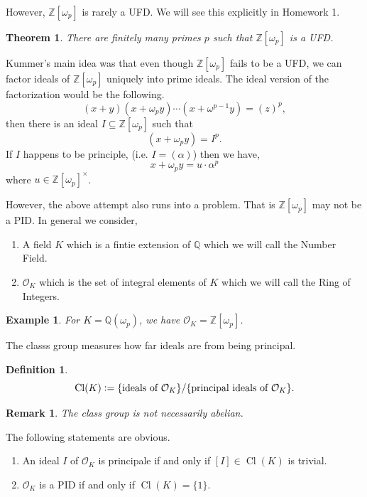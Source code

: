 \documentclass[10pt]{article}
\newtheorem{theorem}{Theorem} [section]
\newtheorem{definition}{Definition}[section]
\newtheorem{remark}{Remark}[section]
\newtheorem{example}{Example}[section]
\DeclareMathOperator{\Cl}{Cl}
\newcommand{\defeq}{\vcentcolon=}
\newcommand{\Z}[0]{\mathbb{Z}}
\newcommand{\Q}[0]{\mathbb{Q}}
\begin{document}
However, $\Z[\omega_p]$ is rarely a UFD. We will see this explicitly in Homework 1.
\begin{theorem}
There are finitely many primes $p$ such that $\Z[\omega_p]$ is a UFD.
\end{theorem}
Kummer's main idea was that even though $\Z[\omega_p]$ fails to be a UFD, we can factor ideals of $\Z[\omega_p]$ uniquely into prime ideals. The ideal version of the factorization would be the following.
\begin{equation*}
    (x+y)(x+\omega_py)\cdots(x+\omega^{p-1}y) = (z)^p,
\end{equation*}
then there is an ideal $I\subseteq\Z[\omega_p]$ such that 
\begin{equation*}
    (x+\omega_py)=I^p.
\end{equation*}
If $I$ happens to be principle, (i.e. $I=(\alpha)$) then we have,
\begin{equation*}
    x+\omega_py = u\cdot\alpha^p
\end{equation*}
where $u\in\Z[\omega_p]^\times$. 
\par However, the above attempt also runs into a problem. That is $\Z[\omega_p]$ may not be a PID. In general we consider,
\begin{enumerate}
    \item A field $K$ which is a fintie extension of $\Q$ which we will call the Number Field.
    \item $\mathcal{O}_K$ which is the set of integral elements of $K$ which we will call the Ring of Integers.
\end{enumerate}
\begin{example}
    For $K=\Q(\omega_p)$, we have $\mathcal{O}_K = \Z[\omega_p]$.
\end{example}
The classs group measures how far ideals are from being principal.
\begin{definition}
\begin{equation*}
    \Cl(K)\defeq \{\text{ideals of $\mathcal{O}_K$}\}/\{\text{principal ideals of $\mathcal{O}_K$}\}.
\end{equation*}
\end{definition}
\begin{remark}
    The class group is not necessarily abelian. 
\end{remark}
The following statements are obvious.
\begin{enumerate}
    \item An ideal $I$ of $\mathcal{O}_K$ is principale if and only if $[I]\in\Cl(K)$ is trivial.
    \item $\mathcal{O}_K$ is a PID if and only if $\Cl(K) = \{1\}$.
\end{enumerate}
\end{document}
